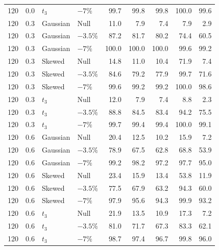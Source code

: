 \begin{longtable}{rrllrrrrr}
120 & 0.0 & $t_3$ & $-7\%$ & 99.7 & 99.8 & 99.8 & 100.0 & 99.6 \\
120 & 0.3 & Gaussian & Null & 11.0 & 7.9 & 7.4 & 7.9 & 2.9 \\
120 & 0.3 & Gaussian & $-3.5\%$ & 87.2 & 81.7 & 80.2 & 74.4 & 60.5 \\
120 & 0.3 & Gaussian & $-7\%$ & 100.0 & 100.0 & 100.0 & 99.6 & 99.2 \\
120 & 0.3 & Skewed & Null & 14.8 & 11.0 & 10.4 & 71.9 & 7.4 \\
120 & 0.3 & Skewed & $-3.5\%$ & 84.6 & 79.2 & 77.9 & 99.7 & 71.6 \\
120 & 0.3 & Skewed & $-7\%$ & 99.6 & 99.2 & 99.2 & 100.0 & 98.6 \\
120 & 0.3 & $t_3$ & Null & 12.0 & 7.9 & 7.4 & 8.8 & 2.3 \\
120 & 0.3 & $t_3$ & $-3.5\%$ & 88.8 & 84.5 & 83.4 & 94.2 & 75.5 \\
120 & 0.3 & $t_3$ & $-7\%$ & 99.7 & 99.4 & 99.4 & 100.0 & 99.1 \\
120 & 0.6 & Gaussian & Null & 20.4 & 12.5 & 10.2 & 15.9 & 7.2 \\
120 & 0.6 & Gaussian & $-3.5\%$ & 78.9 & 67.5 & 62.8 & 68.8 & 53.9 \\
120 & 0.6 & Gaussian & $-7\%$ & 99.2 & 98.2 & 97.2 & 97.7 & 95.0 \\
120 & 0.6 & Skewed & Null & 23.4 & 15.9 & 13.4 & 53.8 & 11.9 \\
120 & 0.6 & Skewed & $-3.5\%$ & 77.5 & 67.9 & 63.2 & 94.3 & 60.0 \\
120 & 0.6 & Skewed & $-7\%$ & 97.9 & 95.6 & 94.3 & 99.9 & 93.2 \\
120 & 0.6 & $t_3$ & Null & 21.9 & 13.5 & 10.9 & 17.3 & 7.2 \\
120 & 0.6 & $t_3$ & $-3.5\%$ & 81.0 & 71.7 & 67.3 & 83.3 & 62.1 \\
120 & 0.6 & $t_3$ & $-7\%$ & 98.7 & 97.4 & 96.7 & 99.8 & 96.0 \\
\end{longtable}
